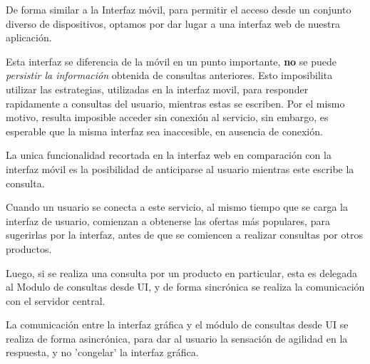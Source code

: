 De forma similar a la Interfaz móvil, para permitir el acceso desde un conjunto diverso de dispositivos, optamos por dar lugar a una interfaz web de nuestra aplicación.

Esta interfaz se diferencia de la móvil en un punto importante, \textbf{no} se puede \emph{persistir la información} obtenida de consultas anteriores. Esto imposibilita utilizar las estrategias, utilizadas en la interfaz movil, para responder rapidamente a consultas del usuario, mientras estas se escriben. Por el mismo motivo, resulta imposible acceder sin conexión al servicio, sin embargo, es esperable que la misma interfaz sea inaccesible, en ausencia de conexión.

La unica funcionalidad recortada en la interfaz web en comparación con la interfaz móvil es la posibilidad de anticiparse al usuario mientras este escribe la consulta.

Cuando un usuario se conecta a este servicio, al mismo tiempo que se carga la interfaz de usuario, comienzan a obtenerse las ofertas más populares, para sugerirlas por la interfaz, antes de que se comiencen a realizar consultas por otros productos.

Luego, si se realiza una consulta por un producto en particular, esta es delegada al \textsf{Modulo de consultas desde UI}, y de forma sincrónica se realiza la comunicación con el servidor central.

La comunicación entre la interfaz gráfica y el módulo de consultas desde UI se realiza de forma asincrónica, para dar al usuario la sensación de agilidad en la respuesta, y no 'congelar' la interfaz gráfica.

